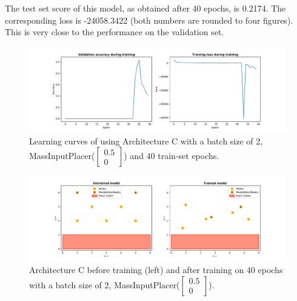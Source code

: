 The test set score of this model, as obtained after 40 epochs, is 0.2174.
The corresponding loss is -24058.3422 (both numbers are rounded to four figures). 
This is very close to the performance on the validation set. 

\begin{figure}[hb]
	\centering
	\includegraphics[scale=0.4]{figures/C_batch2_ConstVelInputPlacer([0.5, 0]])_epoch40_stats.pdf}
	\caption{Learning curves of using Architecture C with 
		a batch size of 2, MassInputPlacer($\begin{bmatrix} 0.5\\0\end{bmatrix}$) and 40 train-set epochs.}
	\label{fig:arch_c_const_vel_50pc_learning_curve}
\end{figure}

\begin{figure}[hb]
	\centering
	\includegraphics[scale=0.4]{figures/C_batch2_ConstVelInputPlacer([0.5, 0]])_epoch40.pdf}
	\caption{Architecture C before training (left) and after training on 40 epochs with 
		a batch size of 2, MassInputPlacer($\begin{bmatrix} 0.5\\0\end{bmatrix}$).}
	\label{fig:arch_c_const_vel_50pc_accuracy}
\end{figure}

\clearpage


